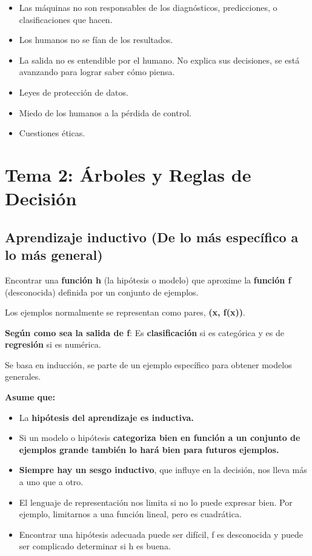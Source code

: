 \documentclass[12pt, twoside, openright]{report} %
\begin{document}
\begin{itemize}
	\item Las máquinas no son responsables de los diagnósticos, predicciones, o
	      clasificaciones que hacen.
	\item Los humanos no se fían de los resultados.
	\item La salida no es entendible por el humano. No explica sus decisiones,
	      se está avanzando para lograr saber cómo piensa.
	\item Leyes de protección de datos.
	\item Miedo de los humanos a la pérdida de control.
	\item Cuestiones éticas.
\end{itemize}

\chapter{Tema 2: Árboles y Reglas de Decisión}

\section{Aprendizaje inductivo (De lo más específico a lo más general)}

Encontrar una \textbf{función h} (la hipótesis o modelo) que aproxime la \textbf{función f} (desconocida) definida por un conjunto de ejemplos.

Los ejemplos normalmente se representan como pares, \textbf{(x, f(x))}.

\textbf{Según como sea la salida de f}: Es \textbf{clasificación} si es categórica y es de \textbf{regresión} si es numérica.

Se basa en inducción, se parte de un ejemplo específico para obtener modelos generales.

\textbf{Asume que:}

\begin{itemize}
	\item La \textbf{hipótesis del aprendizaje es inductiva.}
	\item Si un modelo o hipótesis \textbf{categoriza bien en función a un
		      conjunto de ejemplos grande también lo hará bien para futuros
		      ejemplos.}
	\item \textbf{Siempre hay un sesgo inductivo}, que influye en la decisión, nos lleva más a uno que a otro.
	\item El lenguaje de representación nos limita si no lo puede expresar bien. Por ejemplo, limitarnos a una función lineal, pero es cuadrática.
	\item Encontrar una hipótesis adecuada puede ser difícil, f es desconocida y puede ser complicado determinar si h es buena.
\end{itemize}
\end{document}
